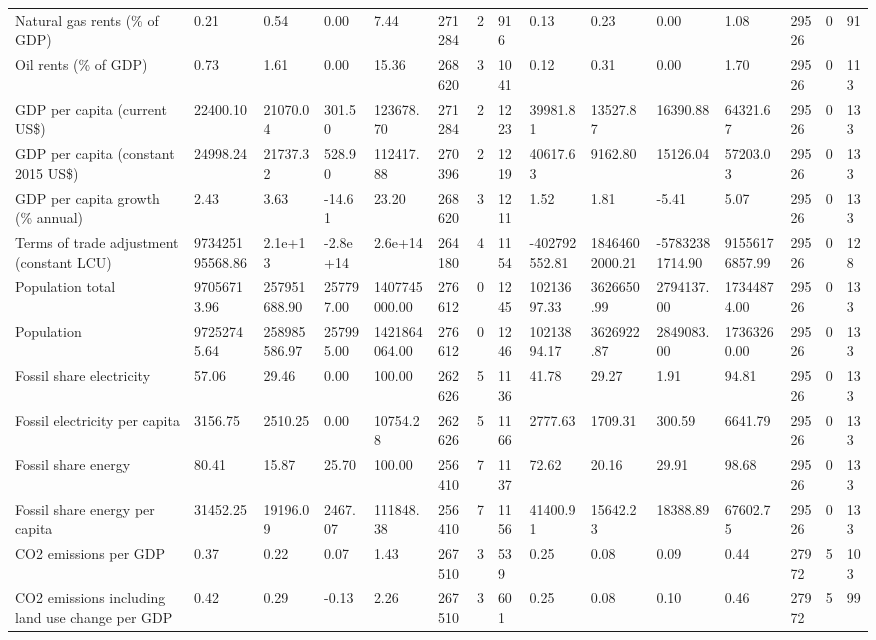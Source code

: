 \begin{longtable}{lllllllllllllll}
\addlinespace
Natural gas rents (\% of GDP) & 0.21 & 0.54 & 0.00 & 7.44 & 271284 & 2 & 916 & 0.13 & 0.23 & 0.00 & 1.08 & 29526 & 0 & 91\\
Oil rents (\% of GDP) & 0.73 & 1.61 & 0.00 & 15.36 & 268620 & 3 & 1041 & 0.12 & 0.31 & 0.00 & 1.70 & 29526 & 0 & 113\\
GDP per capita (current US\$) & 22400.10 & 21070.04 & 301.50 & 123678.70 & 271284 & 2 & 1223 & 39981.81 & 13527.87 & 16390.88 & 64321.67 & 29526 & 0 & 133\\
GDP per capita (constant 2015 US\$) & 24998.24 & 21737.32 & 528.90 & 112417.88 & 270396 & 2 & 1219 & 40617.63 & 9162.80 & 15126.04 & 57203.03 & 29526 & 0 & 133\\
GDP per capita growth (\% annual) & 2.43 & 3.63 & -14.61 & 23.20 & 268620 & 3 & 1211 & 1.52 & 1.81 & -5.41 & 5.07 & 29526 & 0 & 133\\
\addlinespace
Terms of trade adjustment (constant LCU) & 973425195568.86 & 2.1e+13 & -2.8e+14 & 2.6e+14 & 264180 & 4 & 1154 & -402792552.81 & 18464602000.21 & -57832381714.90 & 91556176857.99 & 29526 & 0 & 128\\
Population total & 97056713.96 & 257951688.90 & 257797.00 & 1407745000.00 & 276612 & 0 & 1245 & 10213697.33 & 3626650.99 & 2794137.00 & 17344874.00 & 29526 & 0 & 133\\
Population & 97252745.64 & 258985586.97 & 257995.00 & 1421864064.00 & 276612 & 0 & 1246 & 10213894.17 & 3626922.87 & 2849083.00 & 17363260.00 & 29526 & 0 & 133\\
Fossil share electricity & 57.06 & 29.46 & 0.00 & 100.00 & 262626 & 5 & 1136 & 41.78 & 29.27 & 1.91 & 94.81 & 29526 & 0 & 133\\
Fossil electricity per capita & 3156.75 & 2510.25 & 0.00 & 10754.28 & 262626 & 5 & 1166 & 2777.63 & 1709.31 & 300.59 & 6641.79 & 29526 & 0 & 133\\
\addlinespace
Fossil share energy & 80.41 & 15.87 & 25.70 & 100.00 & 256410 & 7 & 1137 & 72.62 & 20.16 & 29.91 & 98.68 & 29526 & 0 & 133\\
Fossil share energy per capita & 31452.25 & 19196.09 & 2467.07 & 111848.38 & 256410 & 7 & 1156 & 41400.91 & 15642.23 & 18388.89 & 67602.75 & 29526 & 0 & 133\\
CO2 emissions per GDP & 0.37 & 0.22 & 0.07 & 1.43 & 267510 & 3 & 539 & 0.25 & 0.08 & 0.09 & 0.44 & 27972 & 5 & 103\\
CO2 emissions including land use change per GDP & 0.42 & 0.29 & -0.13 & 2.26 & 267510 & 3 & 601 & 0.25 & 0.08 & 0.10 & 0.46 & 27972 & 5 & 99\\

\end{longtable}
